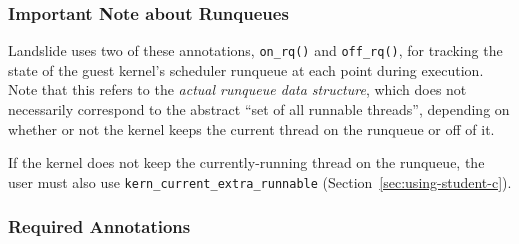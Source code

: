 \subsubsection{Important Note about Runqueues}
\label{sec:using-runqueue}
Landslide uses two of these annotations, \texttt{on\_rq()} and \texttt{off\_rq()}, for tracking the state of the guest kernel's scheduler runqueue at each point during execution.
Note that this refers to the {\em actual runqueue data structure}, which does not necessarily correspond to the abstract ``set of all runnable threads'', depending on whether or not the kernel keeps the current thread on the runqueue or off of it.

If the kernel does not keep the currently-running thread on the runqueue, the user must also use \texttt{kern\_current\_extra\_runnable} (Section~\ref{sec:using-student-c}).

\subsubsection{Required Annotations}


